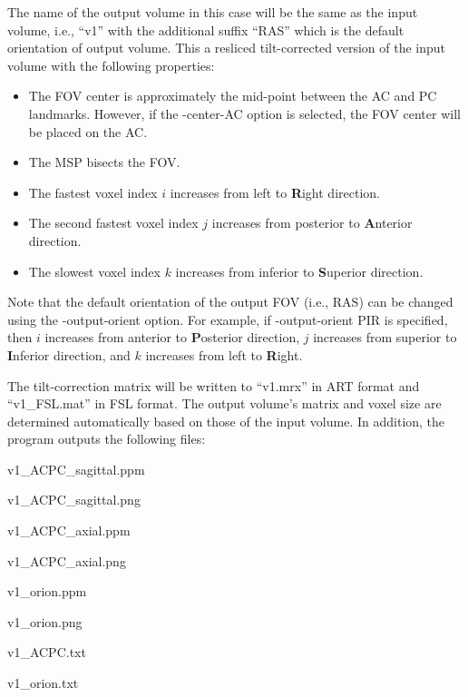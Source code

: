 \documentclass[11pt]{article}
\begin{document}
The name of the output volume in this case will be the same as the input volume, i.e., ``v1'' with the additional
suffix ``RAS'' which is the default orientation of output volume.  This a resliced tilt-corrected
version of the input volume with the following properties:
\begin{itemize}
\item The FOV center is approximately the mid-point between the AC and PC landmarks. However, if the -center-AC
option is selected, the FOV center will be placed on the AC.
\item The MSP bisects the FOV.
\item The fastest voxel index $i$ increases from left to {\bf R}ight direction.
\item The second fastest voxel index $j$ increases from posterior to {\bf A}nterior direction.
\item The slowest voxel index $k$ increases from inferior to {\bf S}uperior direction.
\end{itemize}
Note that the default orientation of the output FOV (i.e., RAS) can be changed using the -output-orient
option.  For example, if -output-orient PIR is specified, then 
$i$ increases from anterior to {\bf P}osterior direction,
$j$ increases from superior to {\bf I}nferior direction,
and $k$ increases from left to {\bf R}ight. 

The tilt-correction matrix 
will be written to ``v1.mrx'' in ART format and ``v1\_FSL.mat'' in FSL format.  The output volume's
matrix and voxel size are determined automatically based on those of the input volume.
In addition, the program outputs the following files:

v1\_ACPC\_sagittal.ppm	

v1\_ACPC\_sagittal.png	

v1\_ACPC\_axial.ppm	

v1\_ACPC\_axial.png	

v1\_orion.ppm

v1\_orion.png		

v1\_ACPC.txt		

v1\_orion.txt
\end{document}
